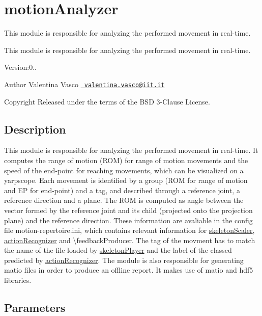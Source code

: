 \section{motion\+Analyzer}
\label{group__motionAnalyzer}


This module is responsible for analyzing the performed movement in real-\/time.  


This module is responsible for analyzing the performed movement in real-\/time. 

Version\+:0.. \begin{DoxyAuthor}{Author}
Valentina Vasco \href{mailto:valentina.vasco@iit.it}{\texttt{ valentina.\+vasco@iit.\+it}} ~\newline
 
\end{DoxyAuthor}
\begin{DoxyCopyright}{Copyright}
Released under the terms of the B\+SD 3-\/Clause License. 
\end{DoxyCopyright}
\hypertarget{group__skeletonViewer_intro_sec}{}\subsection{Description}\label{group__skeletonViewer_intro_sec}
This module is responsible for analyzing the performed movement in real-\/time. It computes the range of motion (R\+OM) for range of motion movements and the speed of the end-\/point for reaching movements, which can be visualized on a yarpscope. Each movement is identified by a group (R\+OM for range of motion and EP for end-\/point) and a tag, and described through a reference joint, a reference direction and a plane. The R\+OM is computed as angle between the vector formed by the reference joint and its child (projected onto the projection plane) and the reference direction. These information are avaliable in the config file motion-\/repertoire.\+ini, which contains relevant information for \mbox{\hyperlink{group__skeletonScaler}{skeleton\+Scaler}}, \mbox{\hyperlink{group__actionRecognizer}{action\+Recognizer}} and \textbackslash{}feedback\+Producer. The tag of the movment has to match the name of the file loaded by \mbox{\hyperlink{group__skeletonPlayer}{skeleton\+Player}} and the label of the classed predicted by \mbox{\hyperlink{group__actionRecognizer}{action\+Recognizer}}. The module is also responsible for generating matio files in order to produce an offline report. It makes use of matio and hdf5 libraries.\hypertarget{group__skeletonViewer_parameters_sec}{}\subsection{Parameters}\label{group__skeletonViewer_parameters_sec}

